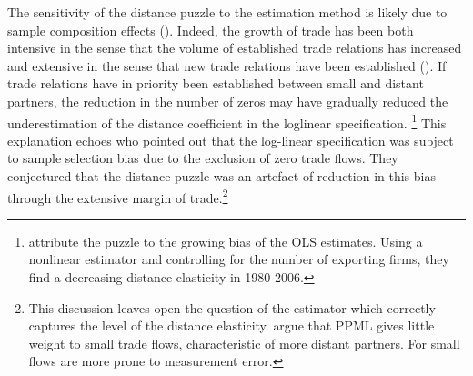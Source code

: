 \documentclass[12pt,twoside,a4paper,notitlepage]{article}
\begin{document}
The sensitivity of the distance puzzle to the estimation method is likely due to sample composition effects (\cite{Head2013,Larch2016}).
Indeed, the growth of trade has been both intensive in the sense that the volume of established trade relations has increased and extensive in the sense that new trade relations have been established (\cite{Helpman2008, Baldwin2011}).
If trade relations have in priority been established between small and distant partners, the reduction in the number of zeros may have gradually reduced the underestimation of the distance coefficient in the loglinear specification.
\footnote{\cite{Larch2016} attribute the puzzle to the growing bias of the OLS estimates.
Using a nonlinear estimator and controlling for the number of exporting firms, they find a decreasing distance elasticity in 1980-2006.}
This explanation echoes \cite{Felbermayr2006} who pointed out that the log-linear specification was subject to sample selection bias due to the exclusion of zero trade flows.
They conjectured that the distance puzzle was an artefact of reduction in this bias through the extensive margin of trade.\footnote{This discussion leaves open the question of the estimator which correctly captures the level of the distance elasticity.
\cite{Head2013} argue that PPML gives little weight to small trade flows, characteristic of more distant partners.
For \cite{SantosSilva2006} small flows are more prone to measurement error.}
\end{document}
